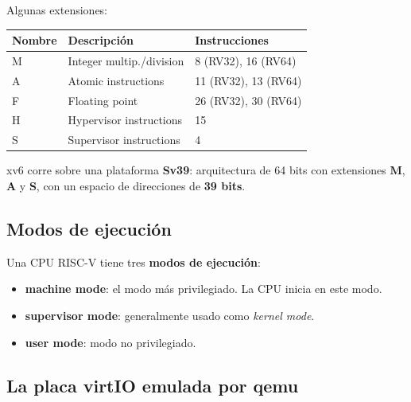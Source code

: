 \documentclass[11pt,a4paper]{article}
\begin{document}
Algunas extensiones:

\begin{center}\small
\begin{tabular}{@{}lll@{}}
\toprule
\textbf{Nombre} & \textbf{Descripción} & \textbf{Instrucciones} \\
\midrule
M & Integer multip./division     & 8 (RV32), 16 (RV64) \\
A & Atomic instructions          & 11 (RV32), 13 (RV64) \\
F & Floating point               & 26 (RV32), 30 (RV64) \\
H & Hypervisor instructions      & 15 \\
S & Supervisor instructions      & 4  \\
\bottomrule
\end{tabular}
\end{center}

\begin{importante}
xv6 corre sobre una plataforma \textbf{Sv39}: arquitectura de 64 bits
con extensiones \textbf{M}, \textbf{A} y \textbf{S}, con un espacio de
direcciones de \textbf{39 bits}.
\end{importante}

\subsection{Modos de ejecución}

Una CPU RISC-V tiene tres \textbf{modos de ejecución}:

\begin{itemize}[leftmargin=*,nosep]
    \item \textbf{machine mode}: el modo más privilegiado. La CPU
        inicia en este modo.
    \item \textbf{supervisor mode}: generalmente usado como
        \emph{kernel mode}.
    \item \textbf{user mode}: modo no privilegiado.
\end{itemize}

\subsection{La placa virtIO emulada por qemu}
\end{document}

